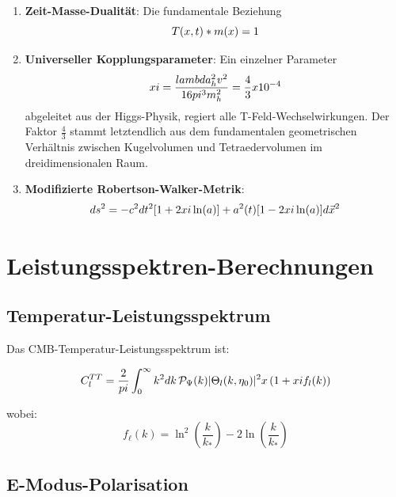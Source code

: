 \documentclass[12pt,a4paper]{article}
\begin{document}
	\begin{enumerate}
		\item \textbf{Zeit-Masse-Dualität}: Die fundamentale Beziehung
		\begin{equation}
			T(x,t) * m(x) = 1
			\label{eq:time_mass_duality}
		\end{equation}
		
		\item \textbf{Universeller Kopplungsparameter}: Ein einzelner Parameter
		\begin{equation}
			xi = \frac{lambda_h^2 v^2}{16pi^3 m_h^2} = \frac{4}{3} x 10^{-4}
			\label{eq:xi_definition}
		\end{equation}
		abgeleitet aus der Higgs-Physik, regiert alle T-Feld-Wechselwirkungen. Der Faktor $\frac{4}{3}$ stammt letztendlich aus dem fundamentalen geometrischen Verhältnis zwischen Kugelvolumen und Tetraedervolumen im dreidimensionalen Raum.
		
		\item \textbf{Modifizierte Robertson-Walker-Metrik}:
		\begin{equation}
			ds^2 = -c^2dt^2[1 + 2xi\ln(a)] + a^2(t)[1 - 2xi\ln(a)]d\vec{x}^2
			\label{eq:modified_metric}
		\end{equation}
	\end{enumerate}
	
	\section{Leistungsspektren-Berechnungen}
	\label{sec:power_spectra}
	
	\subsection{Temperatur-Leistungsspektrum}
	
	Das CMB-Temperatur-Leistungsspektrum ist:
	
	\begin{equation}
		C_l^{TT} = \frac{2}{pi}\int_0^\infty k^2 dk \, \mathcal{P}_\Psi(k) |\Theta_l(k,\eta_0)|^2 x \left(1 + xi f_l(k)\right)
		\label{eq:cl_tt}
	\end{equation}
	
	wobei:
	\begin{equation}
		f_\ell(k) = \ln^2\left(\frac{k}{k_*}\right) - 2\ln\left(\frac{k}{k_*}\right)
	\end{equation}
	
	\subsection{E-Modus-Polarisation}
	
\end{document}
